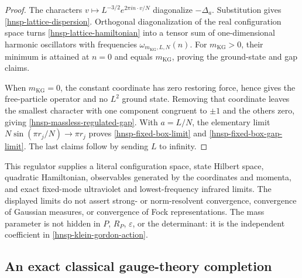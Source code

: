 \begin{proof}
The characters
\(
 v\mapsto L^{-3/2}e^{2\pi i n\cdot v/N}
\)
diagonalize \(-\Delta_a\).  Substitution gives
\eqref{hnsp-lattice-dispersion}.  Orthogonal diagonalization of the real
configuration space turns \eqref{hnsp-lattice-hamiltonian} into a tensor sum
of one-dimensional harmonic oscillators with frequencies
\(\omega_{m_{\mathrm{KG}},L,N}(n)\).  For \(m_{\mathrm{KG}}>0\), their
minimum is attained at \(n=0\) and equals \(m_{\mathrm{KG}}\), proving the
ground-state and gap claims.

When \(m_{\mathrm{KG}}=0\), the constant coordinate has zero restoring force,
hence gives
the free-particle operator and no \(L^2\) ground state.  Removing that
coordinate leaves the smallest character with one component congruent to
\(\pm1\) and the others zero, giving
\eqref{hnsp-massless-regulated-gap}.  With \(a=L/N\), the elementary limit
\(N\sin(\pi r_j/N)\to\pi r_j\) proves
\eqref{hnsp-fixed-box-limit} and \eqref{hnsp-fixed-box-gap-limit}.  The last
claims follow by sending \(L\) to infinity.
\end{proof}

This regulator supplies a literal configuration space, state Hilbert space,
quadratic Hamiltonian, observables generated by the coordinates and momenta,
and exact fixed-mode ultraviolet and lowest-frequency infrared limits.  The
displayed limits do not assert strong- or norm-resolvent convergence,
convergence of Gaussian measures, or convergence of Fock representations.  The mass
parameter is not hidden in \(P\), \(R_P\), \(\varepsilon\), or the
determinant: it is the independent coefficient in
\eqref{hnsp-klein-gordon-action}.

\subsection{An exact classical gauge-theory completion}

